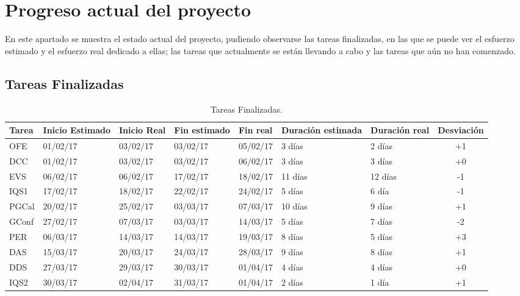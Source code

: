 \section{Progreso actual del proyecto}

\par En este apartado se muestra el estado actual del proyecto, pudiendo observarse las tareas finalizadas, en las que se puede ver el esfuerzo estimado y el esfuerzo real dedicado a ellas; las tareas que actualmente se están llevando a cabo y las tareas que aún no han comenzado.

\subsection{Tareas Finalizadas}
\begin{table}[h]
\begin{center}
\begin{tabular}{ l l l l l l l c }

	Tarea & Inicio Estimado & Inicio Real & Fin estimado & Fin real & Duración estimada & Duración real & Desviación \\ \hline \hline
	OFE	&	01/02/17	&	03/02/17	&	03/02/17	&	05/02/17	&	3 días	&	2 días	&	+1	\\ \hline
DCC	&	01/02/17	&	03/02/17	&	03/02/17	&	06/02/17	&	3 días	&	3 días 	&	+0	\\ \hline
EVS	&	06/02/17	&	06/02/17	&	17/02/17	&	18/02/17	&	11 días	&	12 días	&	-1	\\ \hline
IQS1	&	17/02/17	&	18/02/17	&	22/02/17	&	24/02/17	&	5 días	&	6 día	&	-1	\\ \hline
PGCal	&	20/02/17	&	25/02/17	&	03/03/17	&	07/03/17	&	10 días	&	9 días	&	+1	\\ \hline
GConf	&	27/02/17	&	07/03/17	&	03/03/17	&	14/03/17	&	5 días	&	7 días 	&	-2	\\ \hline
PER	&	06/03/17	&	14/03/17	&	14/03/17	&	19/03/17	&	8 días	&	5 días	&	+3	\\ \hline
DAS	&	15/03/17	&	20/03/17	&	24/03/17	&	28/03/17	&	9 días 	&	8 días	&	+1	\\ \hline
DDS	&	27/03/17	&	29/03/17	&	30/03/17	&	01/04/17	&	4 días	&	4 días 	&	+0	\\ \hline
IQS2	&	30/03/17	&	02/04/17	&	31/03/17	&	01/04/17	&	2 días	&	1 día	&	+1	\\ \hline
\end{tabular}
\caption{Tareas Finalizadas.}
\label{tab:Tareas Finalizadas}
\end{center}
\end{table}

